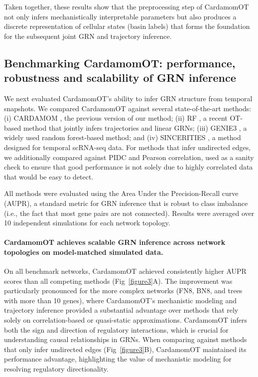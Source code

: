 \documentclass[a4paper, 11pt]{article}
\theoremstyle{plain}
\theoremstyle{remark}
\newcommand*{\firstreview}[1]{{\color{black}#1}}
\begin{document}
Taken together, these results show that the preprocessing step of CardamomOT not only infers mechanistically interpretable parameters but also produces a discrete representation of cellular states (basin labels) that forms the foundation for the subsequent joint GRN and trajectory inference.

\subsection{Benchmarking CardamomOT: performance, robustness and scalability of GRN inference}
\label{subsec:grn_inference_benchmark}

We next evaluated CardamomOT's ability to infer GRN structure from temporal snapshots. We compared CardamomOT against several state-of-the-art methods: (i) CARDAMOM \cite{ventre2023one}, the previous version of our method; (ii) RF \cite{zhang2024joint}, a recent \firstreview{OT}-based method that jointly infers trajectories and linear GRNs; (iii) GENIE3 \cite{huynh2010inferring}, a widely used random forest-based method; and (iv) SINCERITIES \cite{papili2018sincerities}, a method designed for temporal scRNA-seq data. For methods that infer undirected edges, we additionally compared against PIDC \cite{chan2017gene} and Pearson correlation, used as a sanity check to ensure that good performance is not solely due to highly correlated data that would be easy to detect.

All methods were evaluated using the Area Under the Precision-Recall curve (AUPR), a standard metric for GRN inference that is robust to class imbalance (i.e., the fact that most gene pairs are not connected). Results were averaged over 10 independent simulations for each network topology.

\paragraph{\firstreview{CardamomOT achieves scalable GRN inference across network topologies on model-matched simulated data.}}
On all benchmark networks, CardamomOT achieved consistently higher AUPR scores than all competing methods (Fig~\ref{figure3}A). The improvement was particularly pronounced for the more complex networks (FN8, BN8, and trees with more than 10 genes), where CardamomOT's mechanistic modeling and trajectory inference provided a substantial advantage over methods that rely solely on correlation-based or quasi-static approximations. CardamomOT infers both the sign and direction of regulatory interactions, which is crucial for understanding causal relationships in GRNs. When comparing against methods that only infer undirected edges (Fig~\ref{figure3}B), CardamomOT maintained its performance advantage, highlighting the value of mechanistic modeling for resolving regulatory directionality.
\end{document}
